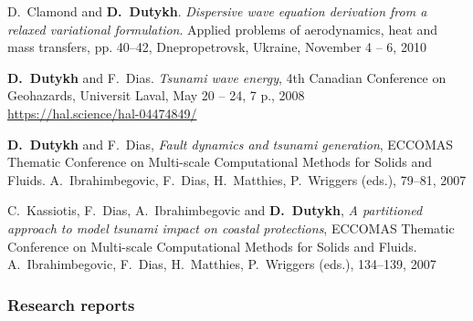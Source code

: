 \documentclass[final, a4paper, oneside, 12pt]{article}
\numberwithin{equation}{section}
\begin{document}
\begin{etaremune}
  \item D.~Clamond and \textbf{D.~Dutykh}. \textit{Dispersive wave equation derivation from a relaxed variational formulation}. Applied problems of aerodynamics, heat and mass transfers, pp. 40--42, Dnepropetrovsk, Ukraine, November 4 -- 6, 2010 %
  


  \item \textbf{D.~Dutykh} and F.~Dias. \textit{Tsunami wave energy}, 4th Canadian Conference on Geohazards, Universit Laval, May 20 -- 24, 7 p., 2008 \\ %
  \url{https://hal.science/hal-04474849/}
  


  \item \textbf{D.~Dutykh} and F.~Dias, \textit{Fault dynamics and tsunami generation}, ECCOMAS Thematic Conference on Multi-scale Computational Methods for Solids and Fluids. A.~Ibrahimbegovic, F.~Dias, H.~Matthies, P.~Wriggers (eds.), 79--81, 2007 %

  \item C.~Kassiotis, F.~Dias, A.~Ibrahimbegovic and \textbf{D.~Dutykh}, \textit{A partitioned approach to model tsunami impact on coastal protections}, ECCOMAS Thematic Conference on Multi-scale Computational Methods for Solids and Fluids. A.~Ibrahimbegovic, F.~Dias, H.~Matthies, P.~Wriggers (eds.), 134--139, 2007 %
  
\end{etaremune}

\subsubsection{Research reports}
\end{document}

